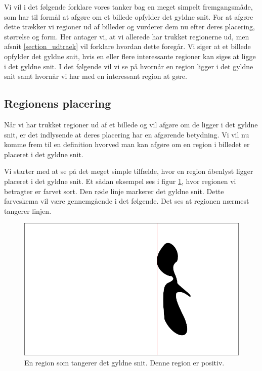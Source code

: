 {
\def\imgscale{0.34}

\textsf{Vi vil i det følgende forklare vores tanker bag en meget simpelt
fremgangsmåde, som har til formål at afgøre om et billede opfylder det
gyldne snit. For at afgøre dette trækker vi regioner ud af billeder og
vurderer dem nu efter deres placering, størrelse og form. Her antager
vi, at vi allerede har trukket regionerne ud, men afsnit
\ref{section_udtraek} vil forklare hvordan dette foregår. Vi siger at et
billede opfylder det gyldne snit, hvis en eller flere interessante
regioner kan siges at ligge i det gyldne snit.  I det følgende vil vi se
på hvornår en region ligger i det gyldne snit samt hvornår vi har med en
interessant region at gøre.
}

\subsection{Regionens placering}
Når vi har trukket regioner ud af et billede og vil afgøre om de ligger
i det gyldne snit, er det indlysende at deres placering har en afgørende
betydning.  Vi vil nu komme frem til en definition hvorved man kan
afgøre om en region i billedet er placeret i det gyldne snit.

Vi starter med at se på det meget simple tilfælde, hvor en region
åbenlyst ligger placeret i det gyldne snit.  Et sådan eksempel ses i
figur \ref{pos_naiv_1}, hvor regionen vi betragter er farvet sort.  Den
røde linje markerer det gyldne snit.  Dette farveskema vil være
gennemgående i det følgende.  Det ses at regionen nærmest tangerer
linjen.

\begin{figure}[h]
    \begin{center}
        \includegraphics[scale=\imgscale,angle=0]{afsnit/vores_implementation/billeder/naiv_algoritme/naiv_positiv_blob_1}
    \end{center}
    \caption[En positiv region]{En region som tangerer det gyldne snit.
    Denne region er positiv.}
    \label{pos_naiv_1}
\end{figure}

}
